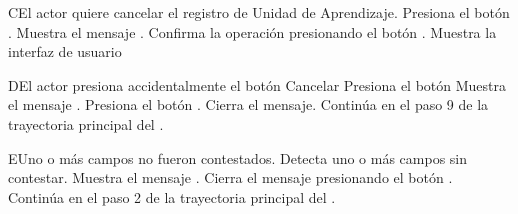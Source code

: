
\begin{UCtrayectoriaA}{C}{El actor quiere cancelar el registro de Unidad de Aprendizaje.}
	\UCpaso[\UCactor] Presiona el botón .
	\UCpaso Muestra el mensaje .
	\UCpaso[\UCactor] Confirma la operación presionando el botón .
	\UCpaso Muestra la interfaz de usuario 
\end{UCtrayectoriaA}




\begin{UCtrayectoriaA}{D}{El actor presiona accidentalmente el botón Cancelar}
	\UCpaso[\UCactor] Presiona el botón 
	\UCpaso Muestra el mensaje .
	\UCpaso[\UCactor] Presiona el botón .
	\UCpaso Cierra el mensaje.
	\UCpaso Continúa en el paso 9 de la trayectoria principal del .
\end{UCtrayectoriaA}




\begin{UCtrayectoriaA}{E}{Uno o más campos  no fueron contestados.}
	\UCpaso Detecta uno o más campos sin contestar.
	\UCpaso Muestra el mensaje .
	\UCpaso[\UCactor] Cierra el mensaje presionando el botón .
	\UCpaso Continúa en el paso 2 de la trayectoria principal del .
\end{UCtrayectoriaA}